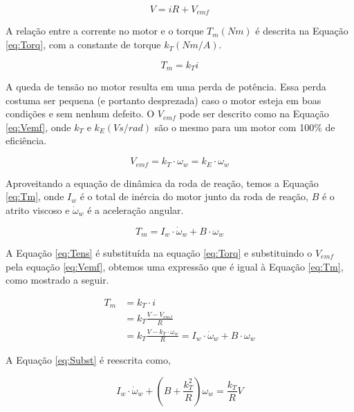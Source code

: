 \documentclass[
	12pt,				%
	openany,			%
	twoside,			%
	a4paper,			%
	english,			%
	french,				%
	spanish,			%
	brazil,				%
	oldfontcommands
	]{abntex2}
\begin{document}
\begin{equation}
V = i R + V_{emf}
\label{eq:Tens}
\end{equation}

A relação entre a corrente no motor e o torque $T_{m}(Nm)$ é descrita na Equação \ref{eq:Torq}, com a constante de torque $k_{T}(Nm/A)$.

\begin{equation}
T_{m} = k_{T} i
\label{eq:Torq}
\end{equation}

A queda de tensão no motor resulta em uma perda de potência. Essa perda costuma ser pequena (e portanto desprezada) caso o motor esteja em boas condições e sem nenhum defeito. O $V_{emf}$ pode ser descrito como na Equação \ref{eq:Vemf}, onde $k_{T}$ e $k_{E}(Vs/rad)$ são o mesmo para um motor com 100\% de eficiência.

\begin{equation}
V_{emf} = k_{T} \cdot \omega_{w} = k_{E} \cdot \omega_{w}
\label{eq:Vemf}
\end{equation}

Aproveitando a equação de dinâmica da roda de reação, temos a Equação \ref{eq:Tm}, onde $I_{w}$ é o total de inércia do motor junto da roda de reação, $B$ é o atrito viscoso e $\dot{\omega}_{w}$ é a aceleração angular.

\begin{equation}
T_{m} = I_{w} \cdot \dot{\omega}_{w} + B \cdot \omega_{w}
\label{eq:Tm}
\end{equation}

A Equação \ref{eq:Tens} é substituída na equação \ref{eq:Torq} e substituindo o $V_{emf}$ pela equação \ref{eq:Vemf}, obtemos uma expressão que é igual à Equação \ref{eq:Tm}, como mostrado a seguir.

\begin{align}
	T_{m} & = k_{T} \cdot i \nonumber \\
	& = k_{T} \frac{V - V_{emf}}{R} \nonumber \\
	& = k_{T} \frac{ V - k_{T} \cdot \omega_{w} }{R} = I_{w} \cdot \dot{\omega}_{w} + B \cdot \omega_{w}
\label{eq:Subst}
\end{align}

A Equação \ref{eq:Subst} é reescrita como,

\begin{equation}
I_{w} \cdot \dot{\omega}_{w} + \left( B + \frac{k_{T}^{2}}{R} \right) \omega_{w} = \frac{k_{T}}{R} V
\label{eq:ReWrite}
\end{equation}
\end{document}
